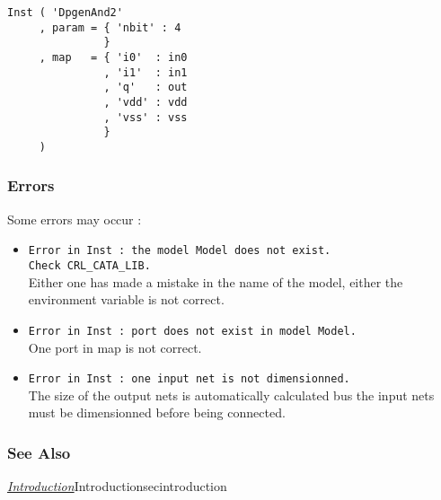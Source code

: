 \begin{verbatim}
Inst ( 'DpgenAnd2'
     , param = { 'nbit' : 4
               }
     , map   = { 'i0'  : in0
               , 'i1'  : in1
               , 'q'   : out
               , 'vdd' : vdd
               , 'vss' : vss
               }
     )
\end{verbatim}
  
\subsubsection{Errors}
    
Some errors may occur :
\begin{itemize}
    \item \verb-Error in Inst : the model Model does not exist.-\\\verb-Check CRL_CATA_LIB.-\\Either one has made a mistake in the name of the model, either the environment variable is not correct.
    \item \verb-Error in Inst : port does not exist in model Model.-\\One port in map is not correct.
    \item \verb-Error in Inst : one input net is not dimensionned.-\\The size of the output nets is automatically calculated bus the input nets must be dimensionned before being connected.
\end{itemize}
         
\subsubsection{See Also}

\hyperref[ref]{\emph{Introduction}}{}{Introduction}{secintroduction}
